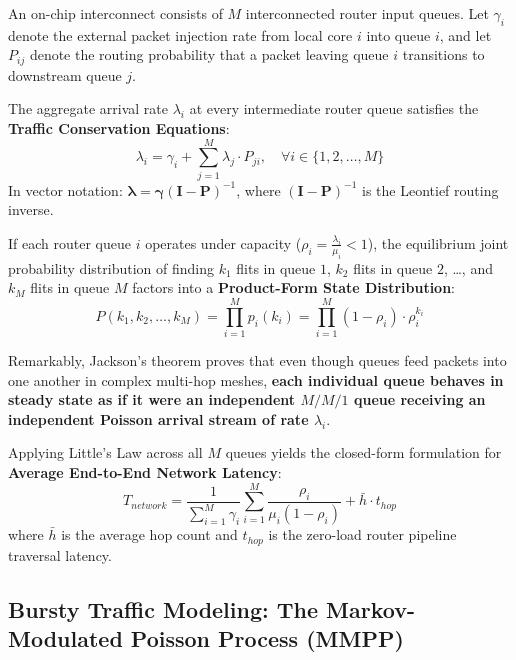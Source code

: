 An on-chip interconnect consists of $M$ interconnected router input queues. Let $\gamma_i$ denote the external packet injection rate from local core $i$ into queue $i$, and let $P_{ij}$ denote the routing probability that a packet leaving queue $i$ transitions to downstream queue $j$.

The aggregate arrival rate $\lambda_i$ at every intermediate router queue satisfies the \textbf{Traffic Conservation Equations}:
\begin{equation}
\lambda_i = \gamma_i + \sum_{j=1}^M \lambda_j \cdot P_{ji}, \quad \forall i \in \{1, 2, \dots, M\}
\label{eq:ch2_traffic_conservation}
\end{equation}
In vector notation: $\boldsymbol{\lambda} = \boldsymbol{\gamma} (\mathbf{I} - \mathbf{P})^{-1}$, where $(\mathbf{I} - \mathbf{P})^{-1}$ is the Leontief routing inverse.

\begin{theorem}
If each router queue $i$ operates under capacity ($\rho_i = \frac{\lambda_i}{\mu_i} < 1$), the equilibrium joint probability distribution of finding $k_1$ flits in queue $1$, $k_2$ flits in queue $2$, \dots, and $k_M$ flits in queue $M$ factors into a \textbf{Product-Form State Distribution}:
\begin{equation}
P(k_1, k_2, \dots, k_M) = \prod_{i=1}^M p_i(k_i) = \prod_{i=1}^M (1 - \rho_i) \cdot \rho_i^{k_i}
\label{eq:ch2_jackson_product}
\end{equation}
\end{theorem}
Remarkably, Jackson's theorem proves that even though queues feed packets into one another in complex multi-hop meshes, \textbf{each individual queue behaves in steady state as if it were an independent $M/M/1$ queue receiving an independent Poisson arrival stream of rate $\lambda_i$}.

Applying Little's Law across all $M$ queues yields the closed-form formulation for \textbf{Average End-to-End Network Latency}:
\begin{equation}
T_{network} = \frac{1}{\sum_{i=1}^M \gamma_i} \sum_{i=1}^M \frac{\rho_i}{\mu_i (1 - \rho_i)} + \bar{h} \cdot t_{hop}
\label{eq:ch2_jackson_total_lat}
\end{equation}
where $\bar{h}$ is the average hop count and $t_{hop}$ is the zero-load router pipeline traversal latency.

\subsection{Bursty Traffic Modeling: The Markov-Modulated Poisson Process (MMPP)}
\label{subsec:ch2_mmpp}

